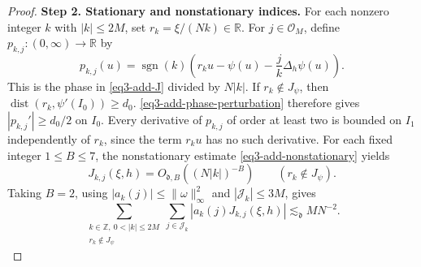 \documentclass[reqno,12pt]{amsart}
\def \Z {\mathbb Z}
\def \R {\mathbb R}
\numberwithin{equation}{section}
\begin{document}
\begin{proof}
\medskip
\noindent\textbf{Step 2. Stationary and nonstationary indices.}
For each nonzero integer $k$ with $|k|\le2M$, set
$r_k=\xi/(Nk)\in\R$. For $j\in\mathcal O_M$, define
$p_{k,j}:(0,\infty)\to\R$ by
\begin{equation}
 p_{k,j}(u)=\operatorname{sgn}(k)
 \left(r_k u-\psi(u)-\frac jk\Delta_h\psi(u)\right).
 \label{eq3-add-normalized-phase}
\end{equation}
This is the phase in \eqref{eq3-add-J} divided by $N|k|$.
If $r_k\notin J_\psi$, then
$\operatorname{dist}(r_k,\psi'(I_0))\ge d_0$.
\eqref{eq3-add-phase-perturbation} therefore gives
$|p_{k,j}'|\ge d_0/2$ on $I_0$.
Every derivative of $p_{k,j}$ of order at least two is bounded on $I_1$
independently of $r_k$, since the term $r_ku$ has no such derivative.
For each fixed integer $1\le B\le 7$, the nonstationary estimate
\eqref{eq3-add-nonstationary} yields
\begin{equation}
 J_{k,j}(\xi,h)=O_{\mathfrak d,B}((N|k|)^{-B})
                   \qquad(r_k\notin J_\psi).
 \label{eq3-add-nonstationary-modes}
\end{equation}
Taking $B=2$, using $|a_k(j)|\le\|\omega\|_\infty^2$ and
$|\mathcal J_k|\le3M$, gives
\begin{equation}
 \sum_{\substack{k\in\Z,\ 0<|k|\le2M\\r_k\notin J_\psi}}
 \sum_{j\in\mathcal J_k}|a_k(j)J_{k,j}(\xi,h)|
 \lesssim_{\mathfrak d}MN^{-2}.
 \label{eq3-add-nonstationary-total}
\end{equation}


\end{proof}
\end{document}
